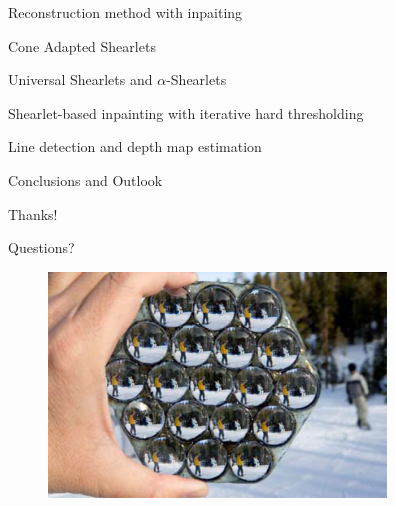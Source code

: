 \begin{frame}{Reconstruction method with inpaiting}

\end{frame}

\begin{frame}{Cone Adapted Shearlets}

\end{frame}

\begin{frame}{Universal Shearlets and $\alpha$-Shearlets}

\end{frame}

\begin{frame}{Shearlet-based inpainting with iterative hard thresholding}

\end{frame}

\begin{frame}{Line detection and depth map estimation}

\end{frame}

\begin{frame}{Conclusions and Outlook}

\end{frame}

\begin{frame}{Thanks!}
\begin{center}
\Large{Questions?}
\end{center}
\begin{figure}[h!]
\centering
\includegraphics[width=0.8\textwidth]{./Images/lf-camera.jpg}
\end{figure}
\end{frame}

